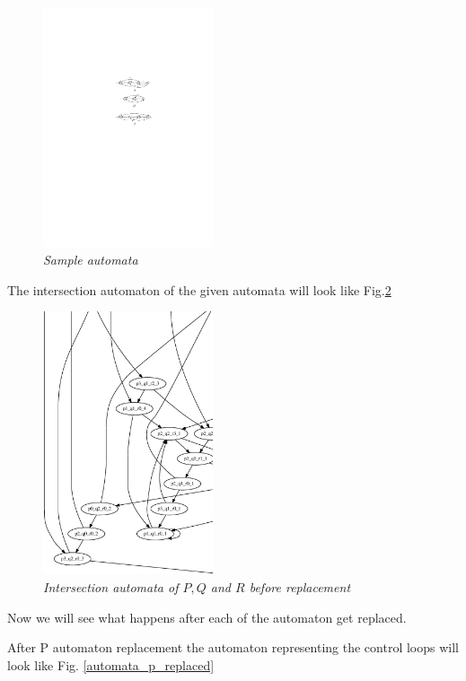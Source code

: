 \begin{figure}
\begin{center}
\includegraphics[width=50mm]{Automaton_original.pdf}
\end{center}
\caption{{\em Sample automata}}
\label{automata_orginal}
\end{figure}

The intersection automaton of the given automata will look like Fig.\ref{graph_orginal}

\begin{figure}
\begin{center}
\includegraphics[width=50mm]{graph_original.pdf}
\end{center}
\caption{{\em Intersection automata of $P, Q$ and $R$ before replacement}}
\label{graph_orginal}
\end{figure}

Now we will see  what happens after each of the automaton get replaced.

After P automaton replacement the automaton representing the control 
loops will look like Fig. \ref{automata_p_replaced}

